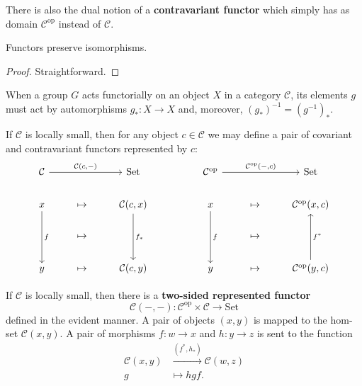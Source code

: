 There is also the dual notion of a \textbf{contravariant functor} which simply has as domain $ \mathcal{C}^{\text{op}} $ instead of $ \mathcal{C} $.

\begin{lemma}
  Functors preserve isomorphisms.
\end{lemma}
\begin{proof}
   Straightforward.
\end{proof}

\begin{corollary}
  When a group $ G $ acts functorially on an object $ X $ in a category $ \mathcal{C} $, its elements $ g $ must act by automorphisms $ g_*:X\to X $ and, moreover, $ (g_*)^{-1}=(g^{-1})_* $.
\end{corollary}

\begin{definition}
  If $ \mathcal{C} $ is locally small, then for any object $ c \in \mathcal{C} $ we may define a pair of covariant and contravariant functors represented by $ c $:
  \[\begin{tikzcd}
	{\mathcal{C}} && {\text{Set}} && {\mathcal{C}^\text{op}} && {\text{Set}} \\
	x & \mapsto & {\mathcal{C}(c,x)} && x & \mapsto & {\mathcal{C}^\text{op}(x,c)} \\
	& \mapsto &&&& \mapsto \\
	y & \mapsto & {\mathcal{C}(c,y)} && y & \mapsto & {\mathcal{C}^\text{op}(y,c)}
	\arrow["{\mathcal{C}(c,-)}", from=1-1, to=1-3]
	\arrow["f", from=2-1, to=4-1]
	\arrow["{f_*}", from=2-3, to=4-3]
	\arrow["{\mathcal{C}^\text{op}(-,c)}", from=1-5, to=1-7]
	\arrow["f", from=2-5, to=4-5]
	\arrow["{f^*}"', from=4-7, to=2-7]
\end{tikzcd}\]

\end{definition}

\begin{definition}
If $ \mathcal{C} $ is locally small, then there is a \textbf{two-sided represented functor}
\[
  \mathcal{C}(-, -): \mathcal{C}^{\text{op}}\times\mathcal{C} \to \text{Set}
\]
defined in the evident manner. A pair of objects $ (x,y) $ is mapped to the hom-set $ \mathcal{C}(x,y) $. A pair of morphisms $ f: w\to x $ and $ h: y\to z $ is sent to the function
\begin{align*}
  \mathcal{C}(x, y) &\xrightarrow{(f^*,h_*)} \mathcal{C}(w,z) \\
  g &\mapsto hgf
.\end{align*}

\end{definition}

